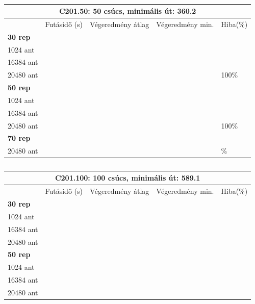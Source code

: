 \begin{table}[ht!]
	\centering
	\begin{tabular}{|p{1.75cm}||p{2cm}|p{3.25cm}|p{3.25cm}|p{1.5cm}|}
		\hline
		\multicolumn{5}{|c|}{C201.50: 50 csúcs, minimális út: 360.2} \\
		\hline
		& Futásidő (s) & Végeredmény átlag & Végeredmény min. & Hiba(\%) \\
		\hline
		\textbf{30 rep} &  &  &  &  \\
		1024 ant &  &  &  &  \\
		16384 ant & &  &  &  \\
		20480 ant &  &  &  & 100\% \\
		\hline
		\textbf{50 rep} &  &  &  &  \\
		1024 ant &  &  &  &  \\
		16384 ant &  &  &  &  \\
		20480 ant &  &  &  & 100\% \\
		\hline
		\hline
		\textbf{70 rep} &  &  &  &  \\
		20480 ant &  &  &  & \% \\
		\hline
	\end{tabular}
	\caption{}
	\label{table:VRTPW_50_2}
\end{table}

\begin{table}[ht!]
	\centering
	\begin{tabular}{|p{1.75cm}||p{2cm}|p{3.25cm}|p{3.25cm}|p{1.5cm}|}
		\hline
		\multicolumn{5}{|c|}{C201.100: 100 csúcs, minimális út: 589.1} \\
		\hline
		& Futásidő (s) & Végeredmény átlag & Végeredmény min. & Hiba(\%) \\
		\hline
		\textbf{30 rep} &  &  &  &  \\
		1024 ant &  &  &  &  \\
		16384 ant & &  &  &  \\
		20480 ant &  &  &  &  \\
		\hline
		\textbf{50 rep} &  &  &  &  \\
		1024 ant &  &  &  &  \\
		16384 ant &  &  &  &  \\
		20480 ant &  &  &  &  \\
		\hline
	\end{tabular}
	\caption{}
	\label{table:VRTPW_100_2}
\end{table}

